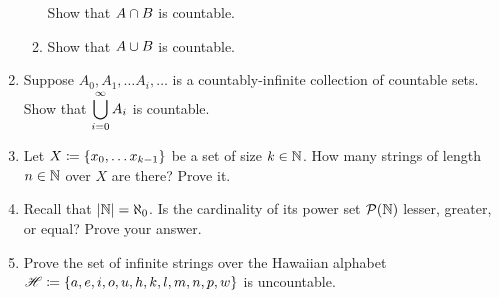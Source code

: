 \begin{enumerate}
\begin{enumerate}
                Show that $A \cap B$ is countable.
            \item
                Show that $A \cup B$ is countable.
        \end{enumerate}
    \item
        Suppose $A_0, A_1, \dots A_i, \dots$ is a countably-infinite collection of countable sets.
        Show that $\displaystyle\bigcup_{i = 0}^{\infty}A_i$ is countable.
    \item
        Let $X \defn \set*{x_0, \dots x_{k - 1}}$ be a set of size $k \in \mathbb{N}$.
        How many strings of length $n \in \mathbb{N}$ over $X$ are there?
        Prove it.
    \item
        Recall that $\lvert\mathbb{N}\rvert = \aleph_0$.
        Is the cardinality of its power set $\power{\N}$ lesser, greater, or equal?
        Prove your answer.
    \item
        Prove the set of infinite strings over the Hawaiian alphabet
        $\mathscr{H} \defn \set*{a, e, i, o, u, h, k, l, m, n, p, w}$ is uncountable.
\end{enumerate}

